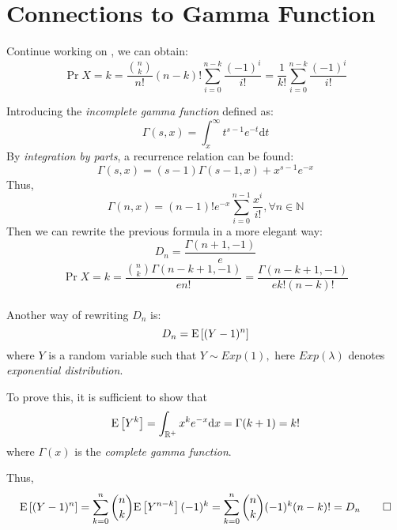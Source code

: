 
\section{Connections to Gamma Function}
Continue working on , we can obtain:
 \begin{equation}
 \Pr{X=k} = \dfrac{{n\choose{k}}}{n!}(n-k)!\sum_{i=0}^{n-k}{\dfrac{(-1)^i}{i!}} = \dfrac{1}{k!}\sum_{i=0}^{n-k}\dfrac{(-1)^i}{i!}
 \label{eqn:def-p}
 \end{equation}

Introducing the \emph{incomplete gamma function}\cite{wiki_ig} defined as:
\[ \Gamma(s,x) = \int_{x}^{\infty}t^{s-1}e^{-t}\mathrm{d}t\]
By \emph{integration by parts}, a recurrence relation can be found:
\[ \Gamma(s,x) = (s-1)\Gamma(s-1,x) + x^{s-1}e^{-x}\]
Thus,
\begin{equation}
\Gamma(n,x) = (n-1)! e^{-x}\sum_{i=0}^{n-1}\dfrac{x^i}{i!}, \forall n\in \mathbb{N}
\label{eqn:rec-gamma}
\end{equation}
Then we can rewrite the previous formula in a more elegant way:
\[ D_n = \dfrac{\Gamma(n+1, -1)}{e}\]
\[ \Pr{X=k}=\dfrac{{n\choose{k}}\Gamma(n-k+1,-1)}{en!} =\dfrac{\Gamma(n-k+1,-1)}{ek!(n-k)!}\]
\\

Another way of rewriting $ D_n$ is:
\[ D_n = \text{E}\left[(Y-1)^n\right]\]
where $ Y$ is a random variable such that $ Y\sim Exp(1),$
here  $Exp(\lambda) $ denotes \emph{exponential distribution}.

To prove this, it is sufficient to show that
\[ \E{Y^k} = \int_{\mathbb{R}^+}x^ke^{-x}\mathrm{d}x = \Gamma(k+1) = k!\]
where $ \Gamma(x)$ is the \emph{complete gamma function}.

Thus,
\[ \E{(Y-1)^n} = \sum_{k=0}^n{n\choose{k}}\E{Y^{n-k}}(-1)^k = \sum_{k=0}^n{n\choose k}(-1)^k(n-k)! = D_n \qed\]
